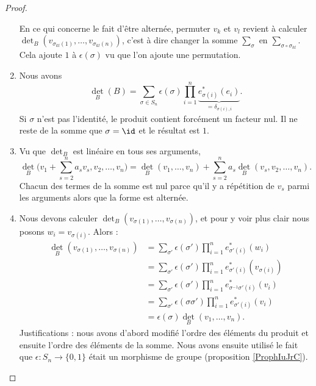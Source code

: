 \begin{proof}
\begin{enumerate}
            En ce qui concerne le fait d'être alternée, permuter \( v_k\) et \( v_l\) revient à calculer \( \det_B( v_{\sigma_{kl}(1)},\ldots, v_{\sigma_{kl}(n)} )\), c'est à dire changer la somme \( \sum_{\sigma}\) en \( \sum_{\sigma\circ\sigma_{kl}}\). Cela ajoute \( 1\) à \( \epsilon(\sigma)\) vu que l'on ajoute une permutation.
        \item
            Nous avons
            \begin{equation}
                \det_B(B)=\sum_{\sigma\in S_n}\epsilon(\sigma)\prod_{i=1}^n\underbrace{e_{\sigma(i)}^*(e_i)}_{=\delta_{\sigma(i),i}}.
            \end{equation}
            Si \( \sigma\) n'est pas l'identité, le produit contient forcément un facteur nul. Il ne reste de la somme que \( \sigma=\id\) et le résultat est \( 1\).
        \item
            Vu que \( \det_B\) est linéaire en tous ses arguments, 
            \begin{equation}
                \det_B\big( v_1+\sum_{s=2}^na_sv_s,v_2,\ldots, v_n \big)=\det_B(v_1,\ldots, v_n)+\sum_{s=2}^na_s\det_B(v_s,v_2,\ldots, v_n).
            \end{equation}
            Chacun des termes de la somme est nul parce qu'il y a répétition de \( v_s\) parmi les arguments alors que la forme est alternée.
        \item
            Nous devons calculer \( \det_B(v_{\sigma(1)},\ldots, v_{\sigma(n)})\), et pour y voir plus clair nous posons \( w_i=v_{\sigma(i)}\). Alors :
            \begin{subequations}
                \begin{align}
                    \det_B(v_{\sigma(1)},\ldots, v_{\sigma(n)})&=\sum_{\sigma'}\epsilon(\sigma')\prod_{i=1}^ne^*_{\sigma'(i)}(w_i)\\
                    &=\sum_{\sigma'}\epsilon(\sigma')\prod_{i=1}^ne^*_{\sigma'(i)}(v_{\sigma(i)})\\
                    &=\sum_{\sigma'}\epsilon(\sigma')\prod_{i=1}^ne^*_{\sigma^{-1}\sigma'(i)}(v_i)\\
                    &=\sum_{\sigma'}\epsilon(\sigma\sigma')\prod_{i=1}^ne^*_{\sigma'(i)}(v_i)\\
                    &=\epsilon(\sigma)\det_B(v_1,\ldots, v_n).
                \end{align}
            \end{subequations}
            Justifications : nous avons d'abord modifié l'ordre des éléments du produit et ensuite l'ordre des éléments de la somme. Nous avons ensuite utilisé le fait que \( \epsilon\colon S_n\to \{ 0,1 \}\) était un morphisme de groupe (proposition \ref{ProphIuJrC}).

\end{enumerate}
\end{proof}
